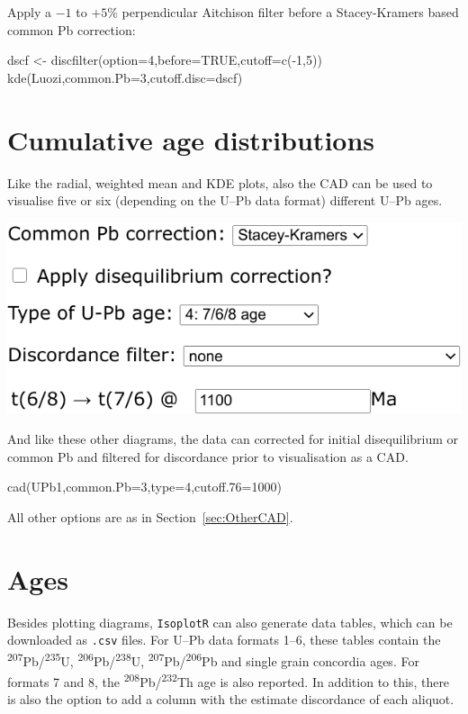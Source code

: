 \begin{refsection}
\noindent Apply a $-1$ to $+5$\% perpendicular Aitchison filter before
a Stacey-Kramers based common Pb correction:
\begin{script}
dscf <- discfilter(option=4,before=TRUE,cutoff=c(-1,5))
kde(Luozi,common.Pb=3,cutoff.disc=dscf)
\end{script}

\section{Cumulative age distributions}
\label{sec:UPbCAD}

Like the radial, weighted mean and KDE plots, also the CAD can be used
to visualise five or six (depending on the U--Pb data format)
different U--Pb ages.\\

\noindent\begin{minipage}[t]{.5\linewidth}
\strut\vspace*{-\baselineskip}\newline
\includegraphics[width=\linewidth]{../figures/UPbCADageTypes.png}
\end{minipage}
\begin{minipage}[t]{.5\linewidth}
  And like these other diagrams, the data can corrected for initial
  disequilibrium or common Pb and filtered for discordance prior to
  visualisation as a CAD.
\end{minipage}

\begin{console}
cad(UPb1,common.Pb=3,type=4,cutoff.76=1000)
\end{console}

All other options are as in Section~\ref{sec:OtherCAD}.

\section{Ages}\label{sec:UPbAges}

Besides plotting diagrams, \texttt{IsoplotR} can also generate data
tables, which can be downloaded as \texttt{.csv} files. For U--Pb data
formats 1--6, these tables contain the
\textsuperscript{207}Pb/\textsuperscript{235}U,
\textsuperscript{206}Pb/\textsuperscript{238}U,
\textsuperscript{207}Pb/\textsuperscript{206}Pb and single grain
concordia ages. For formats 7 and 8, the
\textsuperscript{208}Pb/\textsuperscript{232}Th age is also reported.
In addition to this, there is also the option to add a column with the
estimate discordance of each aliquot.


\end{refsection}
